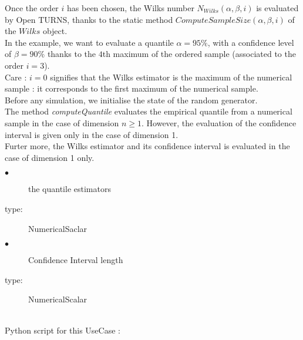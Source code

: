 Once the order $i$ has been chosen, the Wilks number $N_{Wilks}(\alpha, \beta,i)$ is evaluated by Open TURNS, thanks to the static method $ComputeSampleSize(\alpha, \beta, i)$ of the $Wilks$ object.\\

In the example, we want to evaluate a quantile $\alpha = 95\%$, with a confidence level of $\beta = 90\%$ thanks to the $4$th maximum of the ordered sample (associated to the order $i = 3$).\\
Care : $i=0$ signifies that the Wilks estimator is the maximum of the numerical sample : it corresponds to the first maximum of the numerical sample.\\

Before any simulation, we initialise the state of the random generator.\\

The method {\itshape computeQuantile} evaluates the empirical quantile from a numerical sample in the case of dimension $n \geq 1$. However, the evaluation of the confidence interval is given only in the case of dimension 1.\\
Furter more, the Wilks estimator and its confidence interval is evaluated in the case of dimension 1 only.\\

{
  \begin{description}
  \item[$\bullet$] the quantile estimators
  \item[type:] NumericalSaclar
  \item[$\bullet$] Confidence Interval length
  \item[type:] NumericalScalar
  \end{description}
}

\textspace\\
Python script for this UseCase :


